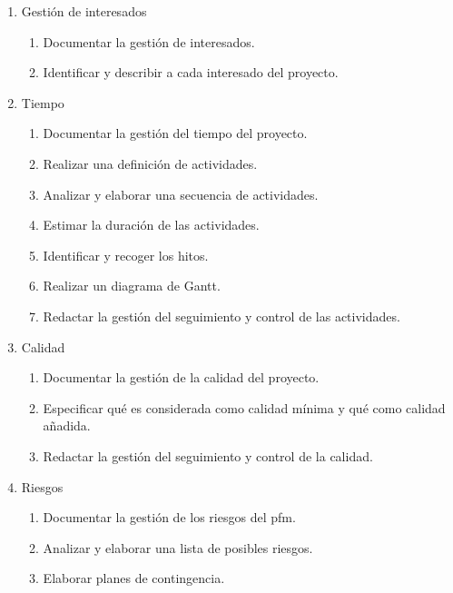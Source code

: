 \begin{enumerate}
\begin{enumerate}
    \item Gestión de interesados

    \begin{enumerate}
      \item Documentar la gestión de interesados.
      \item Identificar y describir a cada interesado del proyecto.
    \end{enumerate}

    \item Tiempo

    \begin{enumerate}

      \item Documentar la gestión del tiempo del proyecto.
      \item Realizar una definición de actividades.
      \item Analizar y elaborar una secuencia de actividades.
      \item Estimar la duración de las actividades.
      \item Identificar y recoger los hitos.
      \item Realizar un diagrama de Gantt.
      \item Redactar la gestión del seguimiento y control de las actividades.

    \end{enumerate}

    \item Calidad

    \begin{enumerate}

      \item Documentar la gestión de la calidad del proyecto.
      \item Especificar qué es considerada como calidad mínima y qué como
        calidad añadida.
      \item Redactar la gestión del seguimiento y control de la calidad.

    \end{enumerate}

    \item Riesgos

    \begin{enumerate}

      \item Documentar la gestión de los riesgos del \gls{pfm}.
      \item Analizar y elaborar una lista de posibles riesgos.
      \item Elaborar planes de contingencia.


\end{enumerate}
\end{enumerate}
\end{enumerate}
